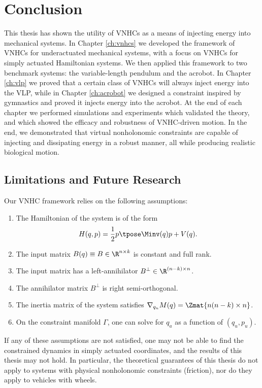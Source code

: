 

\chapter{Conclusion}\label{ch:conclusion}

This thesis has shown the utility of VNHCs as a means of injecting energy into
mechanical systems.
In Chapter \ref{ch:vnhcs} we developed the framework of VNHCs for underactuated
mechanical systems, with a focus on VNHCs for simply actuated Hamiltonian
systems.
We then applied this framework to two benchmark systems: the variable-length
pendulum and the acrobot.
In Chapter \ref{ch:vlp} we proved that a certain class of VNHCs will always
inject energy into the VLP, while in Chapter \ref{ch:acrobot} we designed a
constraint inspired by gymnastics and proved it injects energy into the
acrobot.
At the end of each chapter we performed simulations and experiments which
validated the theory, and which showed the efficacy and robustness of VNHC-driven motion. 
In the end, we demonstrated that virtual nonholonomic constraints are capable of
injecting and dissipating energy in a robust manner, all while producing
realistic biological motion.

\section{Limitations and Future Research}
Our VNHC framework relies on the following assumptions:
\begin{enumerate}
    \item The Hamiltonian of the system is of the form 
        \[
            H(q,p) = \frac{1}{2}p\tpose \Minv(q) p + V(q)
            .
        \]
    \item The input matrix \(B(q) \equiv B \in \R^{n \times k}\) is constant and
        full rank.
    \item The input matrix has a left-annihilator 
        \(B^\perp \in \R^{(n-k)\times n}\). 
    \item The annihilator matrix \(B^\perp\) is right semi-orthogonal.
    \item The inertia matrix of the system satisfies 
        \(\nabla_{q_u}M(q) = \Zmat{n(n-k) \times n}\).
    \item On the constraint manifold \(\Gamma\), one can solve for \(q_a\) as a
        function of \((q_u,p_u)\).
\end{enumerate}
If any of these assumptions are not satisfied, one may not be able to find the
constrained dynamics in simply actuated coordinates, and the results of this
thesis may not hold.
In particular, the theoretical guarantees of this thesis do not apply to systems
with physical nonholonomic constraints (\eg friction), nor do they apply to vehicles
with wheels.

